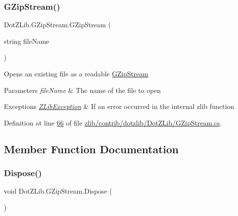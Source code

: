 \subsubsection{\texorpdfstring{G\+Zip\+Stream()}{GZipStream()}\hspace{0.1cm}{\footnotesize\ttfamily [4/4]}}
{\footnotesize\ttfamily Dot\+Z\+Lib.\+G\+Zip\+Stream.\+G\+Zip\+Stream (\begin{DoxyParamCaption}\item[{string}]{file\+Name }\end{DoxyParamCaption})\hspace{0.3cm}{\ttfamily [inline]}}



Opens an existing file as a readable \hyperlink{class_dot_z_lib_1_1_g_zip_stream}{G\+Zip\+Stream} 


\begin{DoxyParams}{Parameters}
{\em file\+Name} & The name of the file to open\\
\hline
\end{DoxyParams}

\begin{DoxyExceptions}{Exceptions}
{\em \hyperlink{class_dot_z_lib_1_1_z_lib_exception}{Z\+Lib\+Exception}} & If an error occurred in the internal zlib function\\
\hline
\end{DoxyExceptions}


Definition at line \hyperlink{zlib_2contrib_2dotzlib_2_dot_z_lib_2_g_zip_stream_8cs_source_l00066}{66} of file \hyperlink{zlib_2contrib_2dotzlib_2_dot_z_lib_2_g_zip_stream_8cs_source}{zlib/contrib/dotzlib/\+Dot\+Z\+Lib/\+G\+Zip\+Stream.\+cs}.



\subsection{Member Function Documentation}
\mbox{\label{class_dot_z_lib_1_1_g_zip_stream_a1fab7340250fa883c12ab08502826d07}} 
\subsubsection{\texorpdfstring{Dispose()}{Dispose()}\hspace{0.1cm}{\footnotesize\ttfamily [1/2]}}
{\footnotesize\ttfamily void Dot\+Z\+Lib.\+G\+Zip\+Stream.\+Dispose (\begin{DoxyParamCaption}{ }\end{DoxyParamCaption})\hspace{0.3cm}{\ttfamily [inline]}}



